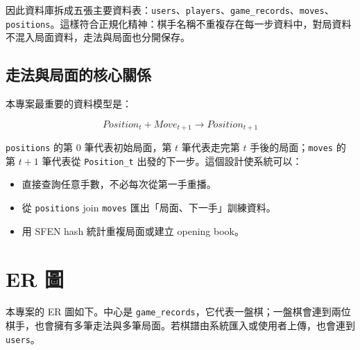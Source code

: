 \documentclass[12pt,a4paper,fontset=none]{ctexart}
\begin{document}
因此資料庫拆成五張主要資料表：\texttt{users}、\texttt{players}、\texttt{game\_records}、\texttt{moves}、\texttt{positions}。這樣符合正規化精神：棋手名稱不重複存在每一步資料中，對局資料不混入局面資料，走法與局面也分開保存。

\subsection{走法與局面的核心關係}

本專案最重要的資料模型是：

\[
Position_t + Move_{t+1} \rightarrow Position_{t+1}
\]

\texttt{positions} 的第 0 筆代表初始局面，第 $t$ 筆代表走完第 $t$ 手後的局面；\texttt{moves} 的第 $t+1$ 筆代表從 \texttt{Position\_t} 出發的下一步。這個設計使系統可以：

\begin{itemize}
  \item 直接查詢任意手數，不必每次從第一手重播。
  \item 從 \texttt{positions} join \texttt{moves} 匯出「局面、下一手」訓練資料。
  \item 用 SFEN hash 統計重複局面或建立 opening book。
\end{itemize}

\section{ER 圖}

本專案的 ER 圖如下。中心是 \texttt{game\_records}，它代表一盤棋；一盤棋會連到兩位棋手，也會擁有多筆走法與多筆局面。若棋譜由系統匯入或使用者上傳，也會連到 \texttt{users}。
\end{document}
